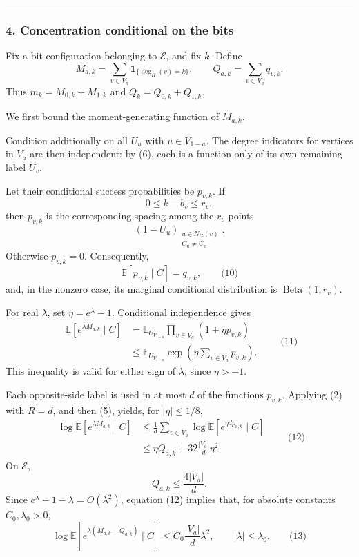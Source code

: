 \documentclass[
  11pt,
  a4paper,
]{article}
\begin{document}
\begin{center}\rule{0.5\linewidth}{0.5pt}\end{center}

\subsubsection{4. Concentration conditional on the
bits}\label{concentration-conditional-on-the-bits}

Fix a bit configuration belonging to \(\mathcal E\), and fix \(k\).
Define \[
M_{a,k}=\sum_{v\in V_a}\mathbf 1_{\{\deg_H(v)=k\}},
\qquad
Q_{a,k}=\sum_{v\in V_a}q_{v,k}.
\] Thus \(m_k=M_{0,k}+M_{1,k}\) and \(Q_k=Q_{0,k}+Q_{1,k}\).

We first bound the moment-generating function of \(M_{a,k}\).

Condition additionally on all \(U_u\) with \(u\in V_{1-a}\). The degree
indicators for vertices in \(V_a\) are then independent: by (6), each is
a function only of its own remaining label \(U_v\).

Let their conditional success probabilities be \(p_{v,k}\). If \[
0\le k-b_v\le r_v,
\] then \(p_{v,k}\) is the corresponding spacing among the \(r_v\)
points \[
(1-U_u)_{\substack{u\in N_G(v)\\C_u\ne C_v}}.
\] Otherwise \(p_{v,k}=0\). Consequently, \[
\mathbb E[p_{v,k}\mid C]=q_{v,k},
\qquad\text{(10)}
\] and, in the nonzero case, its marginal conditional distribution is
\(\operatorname{Beta}(1,r_v)\).

For real \(\lambda\), set \(\eta=e^\lambda-1\). Conditional independence
gives \begin{equation*}
\begin{aligned}
\mathbb E[e^{\lambda M_{a,k}}\mid C]
&=
\mathbb E_{U_{V_{1-a}}}
\prod_{v\in V_a}(1+\eta p_{v,k})\\
&\le
\mathbb E_{U_{V_{1-a}}}
\exp\left(\eta\sum_{v\in V_a}p_{v,k}\right).
\end{aligned}
\qquad\text{(11)}
\end{equation*} This inequality is valid for either sign of \(\lambda\),
since \(\eta>-1\).

Each opposite-side label is used in at most \(d\) of the functions
\(p_{v,k}\). Applying (2) with \(R=d\), and then (5), yields, for
\(|\eta|\le1/8\), \begin{equation*}
\begin{aligned}
\log\mathbb E[e^{\lambda M_{a,k}}\mid C]
&\le
\frac1d\sum_{v\in V_a}
\log\mathbb E[e^{\eta d p_{v,k}}\mid C]\\
&\le
\eta Q_{a,k}+32\frac{|V_a|}{d}\eta^2.
\end{aligned}
\qquad\text{(12)}
\end{equation*} On \(\mathcal E\), \[
Q_{a,k}\le \frac{4|V_a|}{d}.
\] Since \(e^\lambda-1-\lambda=O(\lambda^2)\), equation (12) implies
that, for absolute constants \(C_0,\lambda_0>0\), \[
\log\mathbb E\!\left[
e^{\lambda(M_{a,k}-Q_{a,k})}\mid C
\right]
\le
C_0\frac{|V_a|}{d}\lambda^2,
\qquad |\lambda|\le\lambda_0.
\qquad\text{(13)}
\]
\end{document}
